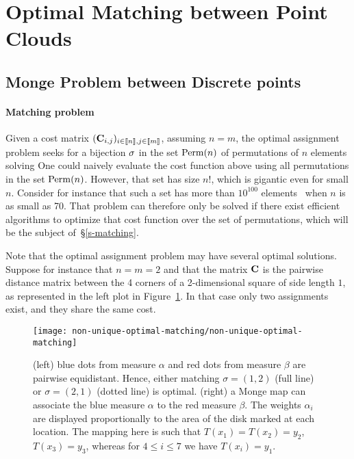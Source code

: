 
\section{Optimal Matching between Point Clouds}

\subsection{Monge Problem between Discrete points}

\paragraph{Matching problem}

Given a cost matrix $(\mathrm{\textbf{\upshape C}}_{i,j})_{i \in \llbracket n\rrbracket, j \in \llbracket m\rrbracket}$, assuming $n=m$, the optimal assignment problem seeks for a bijection $\sigma$ in the set $\mathrm{Perm}(n)$ of permutations of $n$ elements solving
One could naively evaluate the cost function above using all permutations in the set $\mathrm{Perm}(n)$. However, that set has size $n!$, which is gigantic even for small $n$. Consider for instance that such a set has more than $10^{100}$ elements~\cite{Dantzig1983} when $n$ is as small as 70. That problem can therefore only be solved if there exist efficient algorithms to optimize that cost function over the set of permutations, which will be the subject of~\S\ref{s-matching}.

\begin{rem}[Uniqueness] Note that the optimal assignment problem may have several optimal solutions. Suppose for instance that $n=m=2$ and that the matrix $\mathrm{\textbf{\upshape C}}$ is the pairwise distance matrix between the 4 corners of a 2-dimensional square of side length $1$, as represented in the left plot in Figure~\ref{fig-non-unique-matching}. In that case only two assignments exist, and they share the same cost.
\end{rem}

\begin{figure}
\centering
\texttt{[image: non-unique-optimal-matching/non-unique-optimal-matching]}
\caption{\label{fig-non-unique-matching}
(left) blue dots from measure $\alpha$ and red dots from measure $\beta$ are pairwise equidistant. Hence, either matching $\sigma=(1,2)$ (full line) or $\sigma=(2,1)$ (dotted line) is optimal. (right) a Monge map can associate the blue measure $\alpha$ to the red measure $\beta$. The weights $\alpha_i$ are displayed proportionally to the area of the disk marked at each location. The mapping here is such that $T(x_1)=T(x_2)=y_2$, $T(x_3)=y_3$, whereas for $4\leq i\leq 7$ we have $T(x_i)=y_1$.
}
\end{figure}


